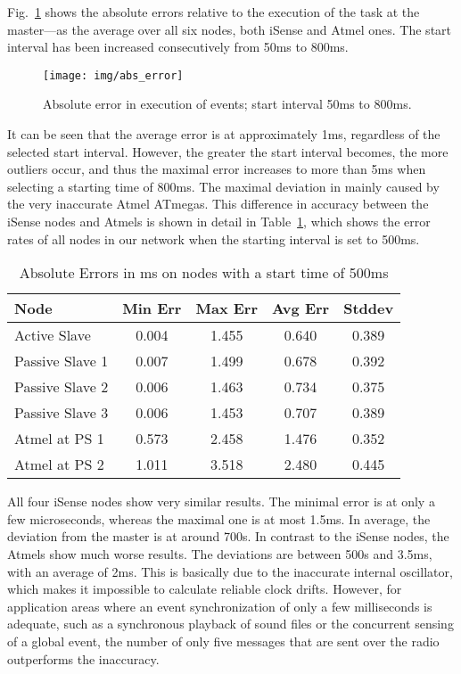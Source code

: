 Fig.~\ref{sec:exp:sync_variation} shows the absolute errors
relative to the execution of the task at the master---as the average
over all six nodes, both iSense and Atmel ones. The start interval has
been increased consecutively from 50ms to 800ms.

\begin{figure}
  \center
  \texttt{[image: img/abs\_error]}
  \caption{Absolute error in execution of events; start interval 50ms
    to 800ms.}
  \label{sec:exp:sync_variation}
\end{figure}

It can be seen that the average error is at approximately 1ms,
regardless of the selected start interval. However, the greater the
start interval becomes, the more outliers occur, and thus the maximal
error increases to more than 5ms when selecting a starting time of
800ms. The maximal deviation in mainly caused by the very
inaccurate Atmel ATmegas. This difference in accuracy between the
iSense nodes and Atmels is shown in detail in
Table~\ref{sec:exp:errors}, which shows the error rates of all
nodes in our network when the starting interval is set to 500ms.

\begin{table}
  \caption{Absolute Errors in ms on nodes with a start time of 500ms}
  \center
  \begin{tabular}{ |l|c c c c| }
    \hline
    Node            & Min Err & Max Err & Avg Err & Stddev \\
    \hline
    Active Slave    & 0.004   & 1.455   & 0.640   & 0.389 \\
    Passive Slave 1 & 0.007   & 1.499   & 0.678   & 0.392 \\
    Passive Slave 2 & 0.006   & 1.463   & 0.734   & 0.375 \\
    Passive Slave 3 & 0.006   & 1.453   & 0.707   & 0.389 \\
    Atmel at PS 1   & 0.573   & 2.458   & 1.476   & 0.352 \\
    Atmel at PS 2   & 1.011   & 3.518   & 2.480   & 0.445 \\
    \hline
  \end{tabular}
  \label{sec:exp:errors}
\end{table}

All four iSense nodes show very similar results. The minimal error is
at only a few microseconds, whereas the maximal one is at most
1.5ms. In average, the deviation from the master is at around
700s. In contrast to the iSense nodes, the Atmels show much worse
results. The deviations are between 500s and 3.5ms, with an
average of 2ms. This is basically due to the inaccurate internal
oscillator, which makes it impossible to calculate reliable clock
drifts. However, for application areas where an event synchronization
of only a few milliseconds is adequate, such as a synchronous
playback of sound files or the concurrent sensing of a global event,
the number of only five messages that are sent over the radio
outperforms the inaccuracy.

